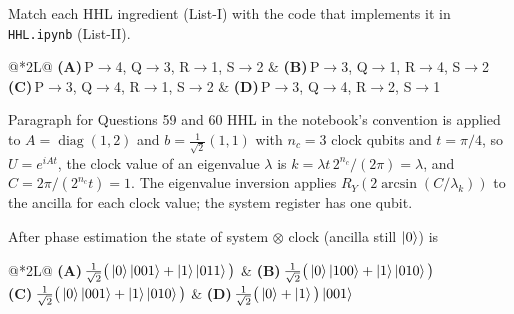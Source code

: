 \documentclass[11pt,a4paper]{article}
\newcommand{\optlabel}[1]{\textbf{(#1)}}
\newenvironment{qitem}[1]{\begin{list}{}{\setlength{\leftmargin}{3.3em}\setlength{\labelwidth}{3.1em}%
  \setlength{\labelsep}{0.2em}\setlength{\topsep}{3pt}\setlength{\parsep}{3pt}}\item[\textbf{Q.#1}\hfill]}{\end{list}}
\newcommand{\qsep}{\par\vspace{2pt}{\color{black!15}\hrule}\vspace{4pt}}
\begin{document}
\begin{qitem}{58}
Match each HHL ingredient (List-I) with the code that implements it in \texttt{HHL.ipynb} (List-II).
\par\smallskip{}
\par\smallskip\noindent\begin{tabularx}{\linewidth}{@{}*{2}{L}@{}}
\optlabel{A}\,P$\to$4, Q$\to$3, R$\to$1, S$\to$2 & \optlabel{B}\,P$\to$3, Q$\to$1, R$\to$4, S$\to$2 \\[3pt]
\optlabel{C}\,P$\to$3, Q$\to$4, R$\to$1, S$\to$2 & \optlabel{D}\,P$\to$3, Q$\to$4, R$\to$2, S$\to$1
\end{tabularx}
\end{qitem}
\qsep

\begin{passagebox}{Paragraph for Questions 59 and 60}
HHL in the notebook's convention is applied to $A = \operatorname{diag}(1, 2)$ and $b = \tfrac{1}{\sqrt2}(1, 1)$ with $n_c = 3$ clock qubits and $t = \pi/4$, so
$U = e^{iAt}$, the clock value of an eigenvalue $\lambda$ is $k = \lambda t\,2^{n_c}/(2\pi) = \lambda$, and $C = 2\pi/(2^{n_c}t) = 1$. The eigenvalue inversion applies
$R_Y(2\arcsin(C/\lambda_k))$ to the ancilla for each clock value; the system register has one qubit.
\end{passagebox}
\begin{qitem}{59}
After phase estimation the state of system $\otimes$ clock (ancilla still $\ket0$) is
\par\smallskip\noindent\begin{tabularx}{\linewidth}{@{}*{2}{L}@{}}
\optlabel{A}\,$\tfrac{1}{\sqrt2}\big(\ket0\ket{001} + \ket1\ket{011}\big)$ & \optlabel{B}\,$\tfrac{1}{\sqrt2}\big(\ket0\ket{100} + \ket1\ket{010}\big)$ \\[3pt]
\optlabel{C}\,$\tfrac{1}{\sqrt2}\big(\ket0\ket{001} + \ket1\ket{010}\big)$ & \optlabel{D}\,$\tfrac{1}{\sqrt2}\big(\ket0 + \ket1\big)\ket{001}$
\end{tabularx}
\end{qitem}
\qsep
\end{document}

